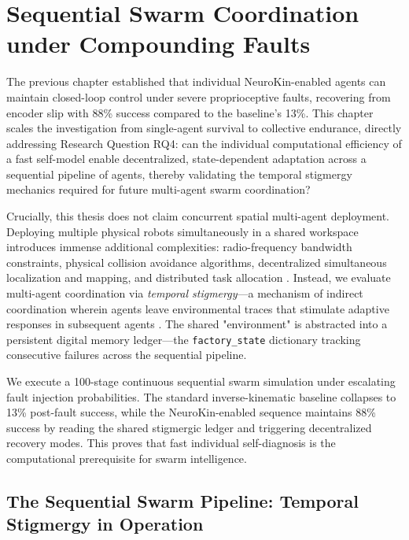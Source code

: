 \documentclass[12pt,a4paper,oneside]{report}
\begin{document}
\chapter{Sequential Swarm Coordination under Compounding Faults}
\label{chap:sequential_swarm_coordination}

The previous chapter established that individual NeuroKin-enabled agents can maintain closed-loop control under severe proprioceptive faults, recovering from encoder slip with 88\% success compared to the baseline's 13\%. This chapter scales the investigation from single-agent survival to collective endurance, directly addressing Research Question RQ4: can the individual computational efficiency of a fast self-model enable decentralized, state-dependent adaptation across a sequential pipeline of agents, thereby validating the temporal stigmergy mechanics required for future multi-agent swarm coordination?

Crucially, this thesis does not claim concurrent spatial multi-agent deployment. Deploying multiple physical robots simultaneously in a shared workspace introduces immense additional complexities: radio-frequency bandwidth constraints, physical collision avoidance algorithms, decentralized simultaneous localization and mapping, and distributed task allocation \cite{matsuki2024gaussian, keetha2024splattam}. Instead, we evaluate multi-agent coordination via \textit{temporal stigmergy}—a mechanism of indirect coordination wherein agents leave environmental traces that stimulate adaptive responses in subsequent agents \cite{bongard2006resilient}. The shared "environment" is abstracted into a persistent digital memory ledger—the \texttt{factory\_state} dictionary tracking consecutive failures across the sequential pipeline.

We execute a 100-stage continuous sequential swarm simulation under escalating fault injection probabilities. The standard inverse-kinematic baseline collapses to 13\% post-fault success, while the NeuroKin-enabled sequence maintains 88\% success by reading the shared stigmergic ledger and triggering decentralized recovery modes. This proves that fast individual self-diagnosis is the computational prerequisite for swarm intelligence.

\section{The Sequential Swarm Pipeline: Temporal Stigmergy in Operation}
\end{document}
